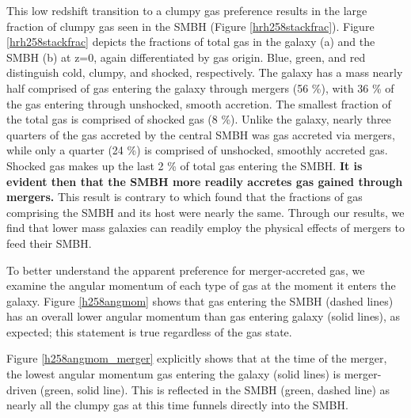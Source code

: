 \documentclass[manuscript]{aastex}
\begin{document}
This low redshift transition to a clumpy gas preference results in the large fraction of clumpy gas seen in the SMBH (Figure \ref{hrh258stackfrac}). Figure \ref{hrh258stackfrac} depicts the fractions of total gas in the galaxy (a) and the SMBH (b) at z=0, again differentiated by gas origin. Blue, green, and red distinguish cold, clumpy, and shocked, respectively. The galaxy has a mass nearly half comprised of gas entering the galaxy through mergers (56 \%), with 36 \% of the gas entering through unshocked, smooth accretion. The smallest fraction of the total gas is comprised of shocked gas (8 \%). Unlike the galaxy, nearly three quarters of the gas accreted by the central SMBH was gas accreted via mergers, while only a quarter (24 \%) is comprised of unshocked, smoothly accreted gas. Shocked gas makes up the last 2 \% of total gas entering the SMBH. \textbf{It is evident then that the SMBH more readily accretes gas gained through mergers.} This result is contrary to \cite{Bellovary2013} which found that the fractions of gas comprising the SMBH and its host were nearly the same. Through our results, we find that lower mass galaxies can readily employ the physical effects of mergers to feed their SMBH.


To better understand the apparent preference for merger-accreted gas, we examine the angular momentum of each type of gas at the moment it enters the galaxy. Figure \ref{h258angmom} shows that gas entering the SMBH (dashed lines) has an overall lower angular momentum than gas entering galaxy (solid lines), as expected; this statement is true regardless of the gas state. 

Figure \ref{h258angmom_merger} explicitly shows that at the time of the merger, the lowest angular momentum gas entering the galaxy (solid lines) is merger-driven (green, solid line). This is reflected in the SMBH (green, dashed line) as nearly all the clumpy gas at this time funnels directly into the SMBH.
\end{document}

